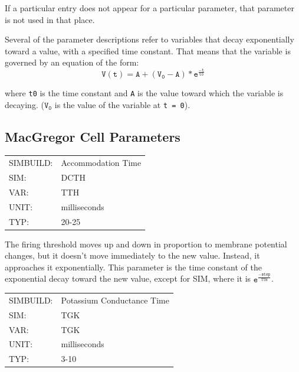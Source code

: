 \documentclass[12pt,openany,oneside]{book}
\newcommand{\ticode}[1]{\texttt{#1}}
\newcommand{\tmcode}[1]{\mathtt{#1}}
\begin{document}
If a particular entry does not appear for a particular parameter, that
parameter is not used in that place.

Several of the parameter descriptions refer to variables that decay
exponentially toward a value, with a specified time constant. That
means that the variable is governed by an equation of the form:
$$
\tmcode{V(t) = A + (V_0 - A) * e^{\tfrac{-t}{t0}}}
$$

\noindent
where \ticode{t0} is the time constant and \ticode{A} is the value toward which the
variable is decaying. ($\tmcode{V_0}$ is the value of the variable at
\ticode{t = 0}).


\vspace{\fill}

\subsection{MacGregor Cell Parameters}
\label{MacGregor Parameters}

\label{TTH}
\begin{flushleft}
\begin{tabular}{@{}ll@{}}
SIMBUILD:  &  Accommodation Time\\
SIM:  &  DCTH\\
VAR:  &  TTH\\
UNIT:  &  milliseconds\\
TYP:  &  20-{}25\\
\end{tabular}
\end{flushleft}

\noindent
The firing threshold moves up and down in proportion to membrane
potential changes, but it doesn't move immediately to the new value.
Instead, it approaches it exponentially. This parameter is the time
constant of the exponential decay toward the new value, except for
SIM, where it is $\tmcode{e^{\tfrac{-step}{TTH}}}$.
\filbreak
\vspace{\baselineskip}

\label{TGK}
\begin{flushleft}
\begin{tabular}{@{}ll@{}}
SIMBUILD:  &  Potassium Conductance Time\\
SIM:  &  TGK\\
VAR:  &  TGK\\
UNIT:  &  milliseconds\\
TYP:  &  3-10\\
\end{tabular}
\end{flushleft}
\end{document}
